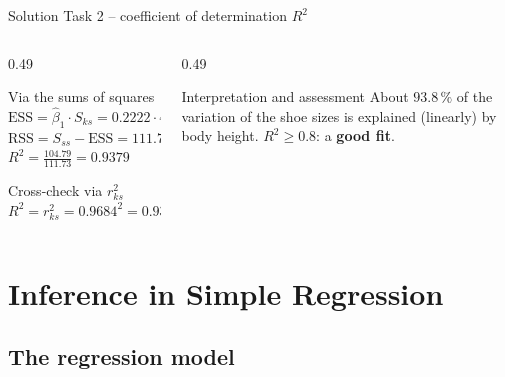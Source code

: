 \documentclass[aspectratio=169,11pt]{beamer}
\begin{document}
\begin{frame}{Solution Task 2 -- coefficient of determination $R^{2}$}
  \begin{columns}[T]
    \begin{column}{0.49\textwidth}
      \begin{block}{Via the sums of squares}
        $\text{ESS} = \hat{\beta}_1 \cdot S_{ks} = 0.2222 \cdot 471.6 = 104.79$\\[3pt]
        $\text{RSS} = S_{ss}-\text{ESS}=111.73 - 104.79 = 6.94$\\[3pt]
        $R^{2} = \frac{104.79}{111.73} = \mathbf{0.9379}$
      \end{block}
      \begin{block}{Cross-check via $r_{ks}^{2}$}
        $R^{2} = r_{ks}^{2} = 0.9684^{2} = 0.9379$ \checkmark
      \end{block}
    \end{column}
    \begin{column}{0.49\textwidth}
      \begin{exampleblock}{Interpretation and assessment}
        About $93.8\,\%$ of the variation of the shoe sizes is explained
        (linearly) by body height. $R^{2} \ge 0.8$: a \textbf{good fit}.
      \end{exampleblock}
    \end{column}
  \end{columns}
\end{frame}

\section[Inference]{Inference in Simple Regression}

\subsection{The regression model}
\end{document}
